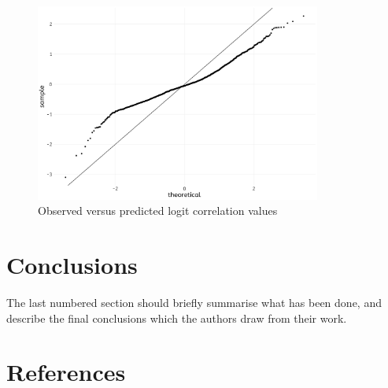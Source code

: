 \documentclass[a4paper,fleqn,usenatbib]{mnras}
\begin{document}
\begin{figure}
  \includegraphics[width=\columnwidth, height = 6.5cm]{figures/residuals-qq}
    \caption{Observed versus predicted logit correlation values}
    \label{fig:residuals-qq}
\end{figure}

\hypertarget{conclusions}{%
\section{Conclusions}\label{conclusions}}

The last numbered section should briefly summarise what has been done,
and describe the final conclusions which the authors draw from their
work.

\hypertarget{references}{%
\section*{References}\label{references}}
\end{document}
